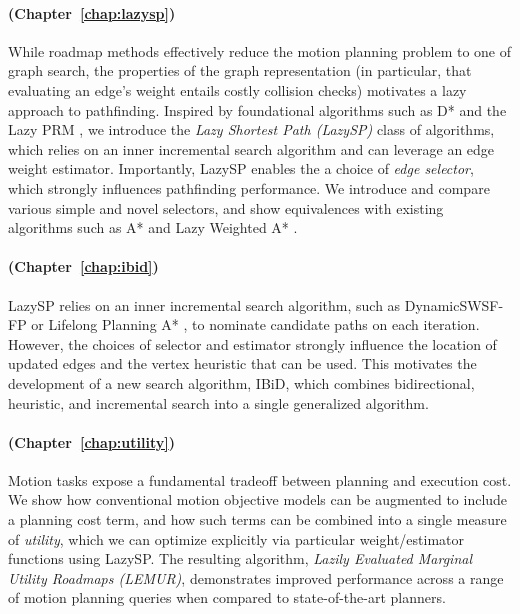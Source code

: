 \paragraph{ (Chapter~\ref{chap:lazysp})}
While roadmap methods effectively reduce the motion planning problem
to one of graph search,
the properties of the graph representation
(in particular, that evaluating an edge's weight entails costly
collision checks)
motivates a lazy approach to pathfinding.
Inspired by foundational algorithms
such as D* \citep{stentz1994dstar}
and the Lazy PRM \citep{bohlin2000lazyprm},
we introduce the \emph{Lazy Shortest Path (LazySP)} class of algorithms,
which relies on an inner incremental search algorithm
and can leverage an edge weight estimator. 
Importantly,
LazySP enables the a choice of \emph{edge selector},
which strongly influences pathfinding performance.
We introduce and compare various simple and novel selectors,
and show equivalences with existing algorithms
such as A* \citep{hart1968astar}
and Lazy Weighted A* \citep{cohen2014narms}.

\paragraph{ (Chapter~\ref{chap:ibid})}
LazySP relies on an inner incremental search algorithm,
such as DynamicSWSF-FP \citep{ramalingam1996dynamicswsffp}
or Lifelong Planning A* \citep{koenig2004lpastar},
to nominate candidate paths on each iteration.
However,
the choices of selector and estimator strongly influence
the location of updated edges
and the vertex heuristic that can be used.
This motivates the development of a new search algorithm,
IBiD,
which combines bidirectional, heuristic, and incremental search
into a single generalized algorithm.

\paragraph{ (Chapter~\ref{chap:utility})}
Motion tasks expose a fundamental tradeoff between planning and
execution cost.
We show how conventional motion objective models
can be augmented to include a planning cost term,
and how such terms can be combined into a single measure of
\emph{utility},
which we can optimize explicitly
via particular weight/estimator functions using LazySP.
The resulting algorithm,
\emph{Lazily Evaluated Marginal Utility Roadmaps (LEMUR)},
demonstrates improved performance across a range of motion planning
queries
when compared to state-of-the-art planners.

